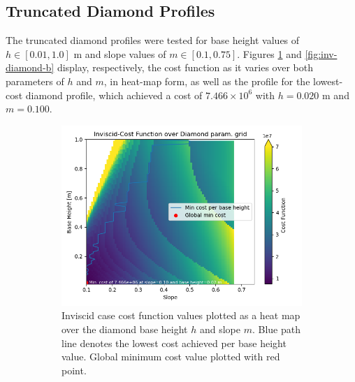 \documentclass[11pt]{article}
\begin{document}
\subsection{Truncated Diamond Profiles}
The truncated diamond profiles were tested for base height values of $h \in [0.01, 1.0]\text{ m}$ and slope values of $m \in [0.1, 0.75]$. Figures \ref{fig:inv-diamond-a} and \ref{fig:inv-diamond-b} display, respectively, the cost function as it varies over both parameters of $h$ and $m$, in heat-map form, as well as the profile for the lowest-cost diamond profile, which achieved a cost of $7.466\times 10^6$ with $h=0.020 \text{ m}$ and $m=0.100$.
\begin{figure}[H]
\centering
\begin{subfigure}[b]{0.54\textwidth}
    \centering
    \includegraphics[width=\linewidth]{../results/inviscid/diamonds.png}
    \caption{Inviscid case cost function values plotted as a heat map over the diamond base height $h$ and slope $m$. Blue path line denotes the lowest cost achieved per base height value. Global minimum cost value plotted with red point.}
    \label{fig:inv-diamond-a}
\end{subfigure}
\hfill
\begin{subfigure}[b]{0.44\textwidth}
    \centering

\end{subfigure}
\end{figure}
\end{document}
